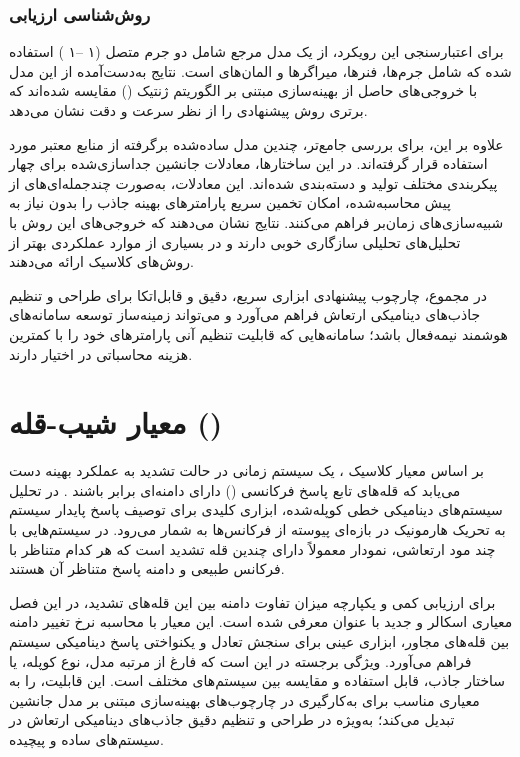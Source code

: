 \subsubsection{روش‌شناسی ارزیابی}
برای اعتبارسنجی این رویکرد، از یک مدل مرجع شامل دو جرم متصل
(۱ –۱ )
استفاده شده که شامل جرم‌ها، فنرها، میراگرها و المان‌های
است. نتایج به‌دست‌آمده از این مدل با خروجی‌های حاصل از بهینه‌سازی مبتنی بر الگوریتم ژنتیک
()
مقایسه شده‌اند که برتری روش پیشنهادی را از نظر سرعت و دقت نشان می‌دهد.

علاوه بر این، برای بررسی جامع‌تر، چندین مدل ساده‌شده برگرفته از منابع معتبر مورد استفاده قرار گرفته‌اند. در این ساختارها، معادلات جانشین جداسازی‌شده برای چهار پیکربندی مختلف تولید و دسته‌بندی شده‌اند. این معادلات، به‌صورت چندجمله‌ای‌های از پیش محاسبه‌شده، امکان تخمین سریع پارامترهای بهینه جاذب را بدون نیاز به شبیه‌سازی‌های زمان‌بر فراهم می‌کنند. نتایج نشان می‌دهند که خروجی‌های این روش با تحلیل‌های تحلیلی سازگاری خوبی دارند و در بسیاری از موارد عملکردی بهتر از روش‌های کلاسیک ارائه می‌دهند.

در مجموع، چارچوب پیشنهادی
ابزاری سریع، دقیق و قابل‌اتکا برای طراحی و تنظیم جاذب‌های دینامیکی ارتعاش فراهم می‌آورد و می‌تواند زمینه‌ساز توسعه سامانه‌های هوشمند نیمه‌فعال باشد؛ سامانه‌هایی که قابلیت تنظیم آنی پارامترهای خود را با کمترین هزینه محاسباتی در اختیار دارند.


\section{معیار شیب-قله ()}

بر اساس معیار کلاسیک 
، یک سیستم زمانی در حالت تشدید به عملکرد بهینه دست می‌یابد که قله‌های تابع پاسخ فرکانسی 
()
 دارای دامنه‌ای برابر باشند \cite{chang1980structural, housner1997structural}. در تحلیل سیستم‌های دینامیکی خطی کوپله‌شده، 
  ابزاری کلیدی برای توصیف پاسخ پایدار سیستم به تحریک هارمونیک در بازه‌ای پیوسته از فرکانس‌ها به شمار می‌رود. در سیستم‌هایی با چند مود ارتعاشی، نمودار 
   معمولاً دارای چندین قله تشدید است که هر کدام متناظر با فرکانس طبیعی و دامنه پاسخ متناظر آن هستند.

برای ارزیابی کمی و یکپارچه میزان تفاوت دامنه بین این قله‌های تشدید، در این فصل معیاری اسکالر و جدید با عنوان 
 معرفی شده است. این معیار با محاسبه نرخ تغییر دامنه بین قله‌های مجاور، ابزاری عینی برای سنجش تعادل و یکنواختی پاسخ دینامیکی سیستم فراهم می‌آورد. ویژگی برجسته 
  در این است که فارغ از مرتبه مدل، نوع کوپله، یا ساختار جاذب، قابل استفاده و مقایسه بین سیستم‌های مختلف است. این قابلیت، 
  را به معیاری مناسب برای به‌کارگیری در چارچوب‌های بهینه‌سازی مبتنی بر مدل جانشین تبدیل می‌کند؛ به‌ویژه در طراحی و تنظیم دقیق جاذب‌های دینامیکی ارتعاش در سیستم‌های ساده و پیچیده.


